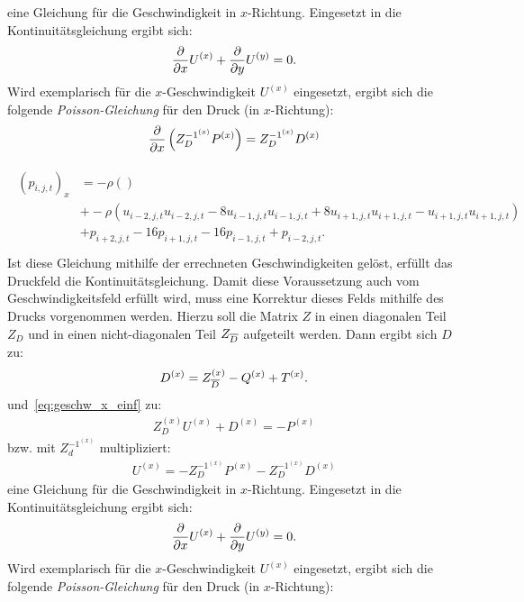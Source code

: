 eine Gleichung für die Geschwindigkeit in $x$-Richtung. Eingesetzt in die Kontinuitätsgleichung ergibt sich:
\begin{align*}
    \frac{\partial }{\partial x} U^{(x)} + \frac{\partial }{\partial y}U^{(y)} = 0.
\end{align*}
Wird exemplarisch für die $x$-Geschwindigkeit $U^{(x)}$ eingesetzt, ergibt sich die folgende \emph{Poisson-Gleichung} für den Druck (in $x$-Richtung):
\begin{align*}
    \frac{\partial }{\partial x}\left( Z_D^{-1^{(x)}} P^{(x)} \right) = Z_D^{-1^{(x)}} D^{(x)}
\end{align*}


\begin{align}
    \begin{split}
    (p_{i,j,t})_x &= -\rho \left(  \right) \\%
    &+ -\rho \left(u_{i-2,j,t}u_{i-2,j,t}-8u_{i-1,j,t}u_{i-1,j,t}+8u_{i+1,j,t}u_{i+1,j,t}-u_{i+1,j,t}u_{i+1,j,t} \right)\\
    &+ p_{i+2,j,t} - 16p_{i+1,j,t} - 16p_{i-1,j,t} + p_{i-2,j,t}. \\
    \end{split}
\end{align}
Ist diese Gleichung mithilfe der errechneten Geschwindigkeiten gelöst, erfüllt das Druckfeld die Kontinuitätsgleichung. Damit diese Voraussetzung auch vom Geschwindigkeitsfeld erfüllt wird, muss eine Korrektur dieses Felds mithilfe des Drucks vorgenommen werden. Hierzu soll die Matrix $Z$ in einen diagonalen Teil $Z_D$ und in einen nicht-diagonalen Teil $Z_{\overline{D}}$ aufgeteilt werden. 
Dann ergibt sich $D$ zu:
\begin{align*}
    D^{(x)} = Z_{\overline{D}}^{(x)} - Q^{(x)} + T^{(x)}.
\end{align*}
und~\eqref{eq:geschw_x_einf} zu:
\begin{align*}
    Z_D^{(x)} U^{(x)} + D^{(x)} = -P^{(x)}
\end{align*}
bzw. mit $Z_d^{-1^{(x)}}$ multipliziert:
\begin{align}
\label{eq:geschw_korrektur}
    U^{(x)} = - Z_D^{-1^{(x)}} P^{(x)} - Z_D^{-1^{(x)}} D^{(x)}
\end{align}
eine Gleichung für die Geschwindigkeit in $x$-Richtung. Eingesetzt in die Kontinuitätsgleichung ergibt sich:
\begin{align*}
    \frac{\partial }{\partial x} U^{(x)} + \frac{\partial }{\partial y}U^{(y)} = 0.
\end{align*}
Wird exemplarisch für die $x$-Geschwindigkeit $U^{(x)}$ eingesetzt, ergibt sich die folgende \emph{Poisson-Gleichung} für den Druck (in $x$-Richtung):
